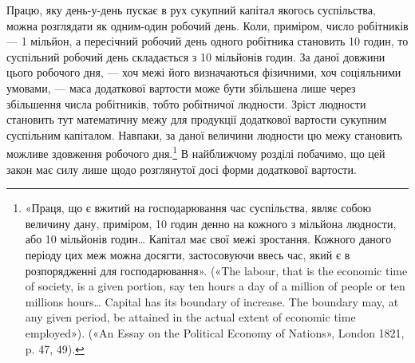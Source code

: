 Працю, яку день-у-день пускає в рух сукупний капітал
якогось суспільства, можна розглядати як одним-один робочий
день. Коли, приміром, число робітників — 1 мільйон, а пересічний
робочий день одного робітника становить 10 годин, то суспільний
робочий день складається з 10 мільйонів годин. За даної
довжини цього робочого дня, — хоч межі його визначаються фізичними,
хоч соціяльними умовами, — маса додаткової вартости може
бути збільшена лише через збільшення числа робітників, тобто
робітничої людности. Зріст людности становить тут математичну
межу для продукції додаткової вартости сукупним суспільним
капіталом. Навпаки, за даної величини людности цю межу становить
можливе здовження робочого дня.\footnote{
«Праця, що є вжитий на господарювання час суспільства, являє
собою величину дану, приміром, 10 годин денно на кожного з мільйона
людности, або 10 мільйонів годин\dots{} Капітал має свої межі зростання.
Кожного даного періоду цих меж можна досягти, застосовуючи ввесь
час, який є в розпорядженні для господарювання». («The labour, that
is the economic time of society, is a given portion, say ten hours a day of
a million of people or ten millions hours\dots{} Capital has its boundary of
increase. The boundary may, at any given period, be attained in the actual
extent of economic time employed»). («An Essay on the Political Economy
of Nations», London 1821, p. 47, 49).
} В найближчому розділі
побачимо, що цей закон має силу лише щодо розглянутої досі
форми додаткової вартости.


